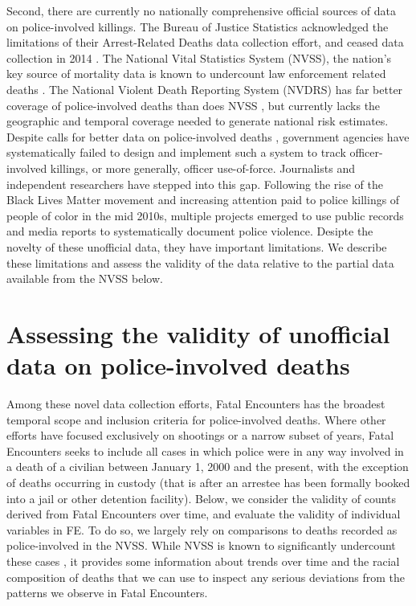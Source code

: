 \documentclass[9pt,twoside,lineno]{pnas-new}
\begin{document}
Second, there are currently no nationally comprehensive official sources of data on police-involved killings. The Bureau of Justice Statistics acknowledged the limitations of their Arrest-Related Deaths data collection effort, and ceased data collection in 2014 \cite{banks2016arrest}. The National Vital Statistics System (NVSS), the nation's key source of mortality data is known to undercount law enforcement related deaths \cite{Feldman2017Quantifying}. The National Violent Death Reporting System (NVDRS) has far better coverage of police-involved deaths than does NVSS \cite{conner2019validating}, but currently lacks the geographic and temporal coverage needed to generate national risk estimates. Despite calls for better data on police-involved deaths \cite{Krieger2015Police}, government agencies have systematically failed to design and implement such a system to track officer-involved killings, or more generally, officer use-of-force. Journalists and independent researchers have stepped into this gap. Following the rise of the Black Lives Matter movement and increasing attention paid to police killings of people of color in the mid 2010s, multiple projects emerged to use public records and media reports to systematically document police violence. Desipte the novelty of these unofficial data, they have important limitations. We describe these limitations and assess the validity of the data relative to the partial data available from the NVSS below.

\section*{Assessing the validity of unofficial data on police-involved deaths}

Among these novel data collection efforts, Fatal Encounters has the broadest temporal scope and inclusion criteria for police-involved deaths. Where other efforts have focused exclusively on shootings or a narrow subset of years, Fatal Encounters seeks to include all cases in which police were in any way involved in a death of a civilian between January 1, 2000 and the present, with the exception of deaths occurring in custody (that is after an arrestee has been formally booked into a jail or other detention facility). Below, we consider the validity of counts derived from Fatal Encounters over time, and evaluate the validity of individual variables in FE. To do so, we largely rely on comparisons to deaths recorded as police-involved in the NVSS. While NVSS is known to significantly undercount these cases \cite{Feldman2017Quantifying}, it provides some information about trends over time and the racial composition of deaths that we can use to inspect any serious deviations from the patterns we observe in Fatal Encounters.
\end{document}
